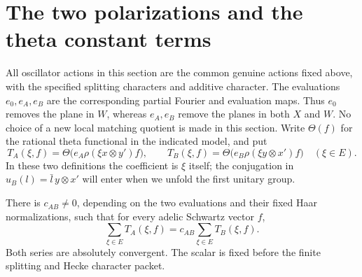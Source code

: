

\section{The two polarizations and the theta constant terms}
\label{sec:sr-theta-constant-terms}

All oscillator actions in this section are the common genuine actions
fixed above, with the specified splitting characters and additive
character. The evaluations \(e_0,e_A,e_B\) are the corresponding partial
Fourier and evaluation maps. Thus \(e_0\) removes the plane in \(W\),
whereas \(e_A,e_B\) remove the planes in both \(X\) and \(W\).
No choice of a new local matching quotient is made in this section.
Write \(\Theta(f)\) for the rational theta functional in the indicated
model, and put
\[
 T_A(\xi,f)=\Theta\bigl(e_A\rho(\xi x\otimes y')f\bigr),
 \qquad
 T_B(\xi,f)=\Theta\bigl(e_B\rho(\xi y\otimes x')f\bigr)
 \quad(\xi\in E).
\]
In these two definitions the coefficient is \(\xi\) itself; the
conjugation in \(u_B(l)=\bar l\,y\otimes x'\) will enter when we unfold
the first unitary group.

\begin{srlemma}
\label{lem:sr-theta-two-line-poisson}
There is \(c_{AB}\ne0\), depending on the two evaluations and their
fixed Haar normalizations, such that for every adelic Schwartz vector
\(f\),
\[
 \sum_{\xi\in E}T_A(\xi,f)
        =c_{AB}\sum_{\xi\in E}T_B(\xi,f).
 \tag{T1}\label{eq:sr-theta-two-line-poisson}
\]
Both series are absolutely convergent. The scalar is fixed before the
finite splitting and Hecke character packet.
\end{srlemma}

